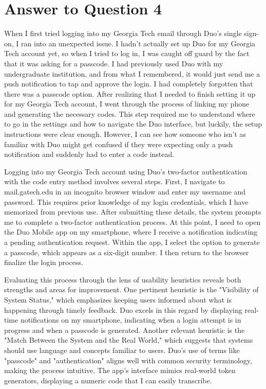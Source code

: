 \documentclass[
	letterpaper, %
]{jdf}
\begin{document}
\section{Answer to Question 4}
When I first tried logging into my Georgia Tech email through Duo’s single sign-on, I ran into an unexpected issue. I hadn’t actually set up Duo for my Georgia Tech account yet, so when I tried to log in, I was caught off guard by the fact that it was asking for a passcode. I had previously used Duo with my undergraduate institution, and from what I remembered, it would just send me a push notification to tap and approve the login. I had completely forgotten that there was a passcode option. After realizing that I needed to finish setting it up for my Georgia Tech account, I went through the process of linking my phone and generating the necessary codes. This step required me to understand where to go in the settings and how to navigate the Duo interface, but luckily, the setup instructions were clear enough. However, I can see how someone who isn’t as familiar with Duo might get confused if they were expecting only a push notification and suddenly had to enter a code instead. 

Logging into my Georgia Tech account using Duo's two-factor authentication with the code entry method involves several steps. First, I navigate to mail.gatech.edu in an incognito browser window and enter my username and password. This requires prior knowledge of my login credentials, which I have memorized from previous use. After submitting these details, the system prompts me to complete a two-factor authentication process. At this point, I need to open the Duo Mobile app on my smartphone, where I receive a notification indicating a pending authentication request. Within the app, I select the option to generate a passcode, which appears as a six-digit number. I then return to the browser finalize the login process. 

Evaluating this process through the lens of usability heuristics reveals both strengths and areas for improvement. One pertinent heuristic is the "Visibility of System Status," which emphasizes keeping users informed about what is happening through timely feedback. Duo excels in this regard by displaying real-time notifications on my smartphone, indicating when a login attempt is in progress and when a passcode is generated. Another relevant heuristic is the "Match Between the System and the Real World," which suggests that systems should use language and concepts familiar to users. Duo's use of terms like "passcode" and "authentication" aligns well with common security terminology, making the process intuitive. The app's interface mimics real-world token generators, displaying a numeric code that I can easily transcribe. 
\end{document}
